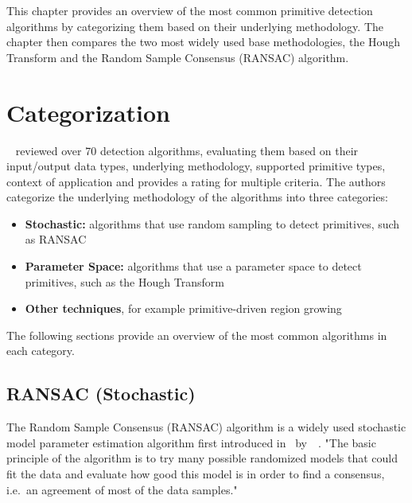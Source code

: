 This chapter provides an overview of the most common primitive detection algorithms by categorizing them based on their underlying methodology.
The chapter then compares the two most widely used base methodologies,
the Hough Transform and the Random Sample Consensus (RANSAC) algorithm.


\section{Categorization}
\citeauthor{kaiser_survey_2019}~\cite{kaiser_survey_2019} reviewed over 70 detection algorithms, evaluating them based on their input/output data types,
underlying methodology, supported primitive types, context of application and provides a rating for multiple criteria.
The authors categorize the underlying methodology of the algorithms into three categories:
\begin{itemize}
    \item \textbf{Stochastic:} algorithms that use random sampling to detect primitives, such as RANSAC
    \item \textbf{Parameter Space:} algorithms that use a parameter space to detect primitives, such as the Hough Transform
    \item \textbf{Other techniques}, for example primitive-driven region growing
\end{itemize}

The following sections provide an overview of the most common algorithms in each category.

\subsection{RANSAC (Stochastic)}
The Random Sample Consensus (RANSAC) algorithm is a widely used stochastic model parameter estimation
algorithm first introduced in~\citeyear{fischler_random_1981}
by~\citeauthor{fischler_random_1981}~\cite{fischler_random_1981}.
"The basic principle of the algorithm is to try many possible randomized models that could fit
the data and evaluate how good this model is in order to find a consensus,
i.e.\ an agreement of most of the data samples."~\parencite{kaiser_survey_2019}

